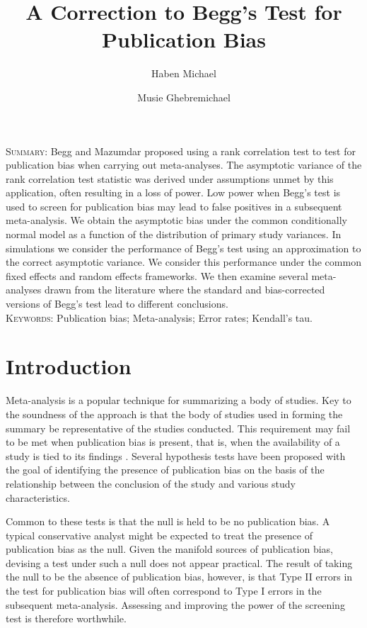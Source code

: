 \documentclass[12pt]{article}
\title{A Correction to Begg's Test for Publication Bias}
\author[1]{Haben Michael}
\author[2]{Musie Ghebremichael}
\affil[1]{University of Massachusetts, Amherst, MA (hmichael@math.umass.edu)}
\affil[2]{Ragon Institute and Harvard University, Cambridge, MA (musie\_ghebremichael@dfci.harvard.edu)}
\date{}
\begin{document}
\maketitle

\noindent \textsc{Summary}: Begg and Mazumdar proposed using a rank
correlation test to test for publication bias when carrying out
meta-analyses. The asymptotic variance of the rank correlation test
statistic was derived under assumptions unmet by this application,
often resulting in a loss of power. Low power when Begg's test is used
to screen for publication bias may lead to false positives in a
subsequent meta-analysis. We obtain the asymptotic bias under the
common conditionally normal model as a function of the distribution of
primary study variances. In simulations we consider the performance of
Begg's test using an approximation to the correct asymptotic
variance. We consider this performance under the common fixed effects
and random effects frameworks. We then examine several meta-analyses
drawn from the literature where the standard and
bias-corrected versions of Begg's test lead to different conclusions.\\
\textsc{Keywords}: Publication bias; Meta-analysis; Error rates;
Kendall's tau.

\section{Introduction}

  Meta-analysis is a popular technique for summarizing a body of
  studies. Key to the soundness of the approach is that the body of
  studies used in forming the summary be representative of the studies conducted. This
  requirement may fail to be met when publication bias is present, that is,
  when the availability of a study is tied to its findings \citep{begg1994b}. Several
  hypothesis tests have been proposed with the goal of identifying the
  presence of publication bias on the basis of the relationship
  between the conclusion of the study and various study
  characteristics.
  
  Common to these tests is that the null is held to be no publication
  bias. A typical conservative analyst might be expected to treat the
  presence of publication bias as the null. Given the manifold sources
  of publication bias, devising a test under such a null does not
  appear practical. The result of taking the null to be the absence of
  publication bias, however, is that Type II errors in the test for
  publication bias will often correspond to Type I errors in the
  subsequent meta-analysis. Assessing and improving the power of the
  screening test is therefore worthwhile.
\end{document}
